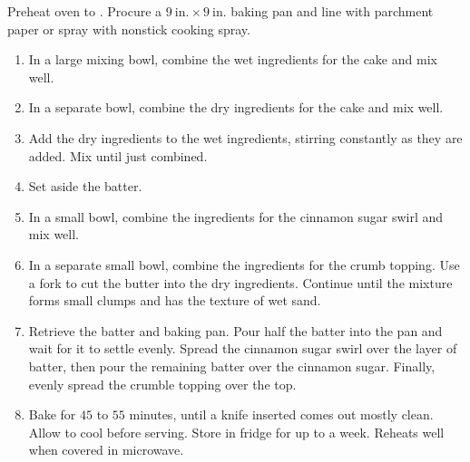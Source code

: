 \documentclass{article}
\begin{document}
\begin{minipage}{\textwidth}
\instructions
Preheat oven to . Procure a $9~\mathrm{in.}\times9~\mathrm{in.}$ baking pan and line with parchment paper or spray with nonstick cooking spray.
\begin{enumerate}
    \item In a large mixing bowl, combine the wet ingredients for the cake and mix well.
    \item In a separate bowl, combine the dry ingredients for the cake and mix well.
    \item Add the dry ingredients to the wet ingredients, stirring constantly as they are added. Mix until just combined.
    \item Set aside the batter.
    \item In a small bowl, combine the ingredients for the cinnamon sugar swirl and mix well.
    \item In a separate small bowl, combine the ingredients for the crumb topping. Use a fork to cut the butter into the dry ingredients. Continue until the mixture forms small clumps and has the texture of wet sand.
    \item Retrieve the batter and baking pan. Pour half the batter into the pan and wait for it to settle evenly. Spread the cinnamon sugar swirl over the layer of batter, then pour the remaining batter over the cinnamon sugar. Finally, evenly spread the crumble topping over the top.
    \item Bake for $45$ to $55$ minutes, until a knife inserted comes out mostly clean. Allow to cool before serving. Store in fridge for up to a week. Reheats well when covered in microwave.
\end{enumerate}

\spewfootnotes
\end{minipage}
\end{document}
